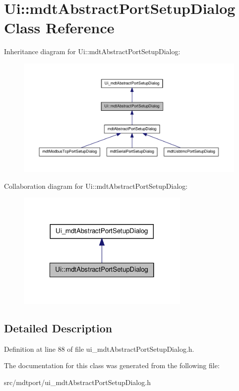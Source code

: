 \hypertarget{class_ui_1_1mdt_abstract_port_setup_dialog}{
\section{Ui::mdtAbstractPortSetupDialog Class Reference}
\label{class_ui_1_1mdt_abstract_port_setup_dialog}
}


Inheritance diagram for Ui::mdtAbstractPortSetupDialog:\nopagebreak
\begin{figure}[H]
\begin{center}
\leavevmode
\includegraphics[width=400pt]{class_ui_1_1mdt_abstract_port_setup_dialog__inherit__graph}
\end{center}
\end{figure}


Collaboration diagram for Ui::mdtAbstractPortSetupDialog:\nopagebreak
\begin{figure}[H]
\begin{center}
\leavevmode
\includegraphics[width=236pt]{class_ui_1_1mdt_abstract_port_setup_dialog__coll__graph}
\end{center}
\end{figure}


\subsection{Detailed Description}


Definition at line 88 of file ui\_\-mdtAbstractPortSetupDialog.h.



The documentation for this class was generated from the following file:\begin{DoxyCompactItemize}
\item 
src/mdtport/ui\_\-mdtAbstractPortSetupDialog.h\end{DoxyCompactItemize}
